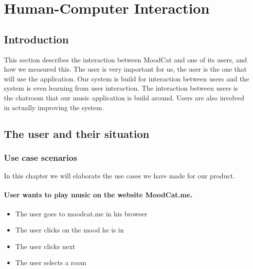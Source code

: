 \chapter{Human-Computer Interaction}

\section{Introduction}
This section describes the interaction between MoodCat and one of its users, and how we measured this.
The user is very important for us, the user is the one that will use the application.
Our system is build for interaction between users and the system is even learning from user interaction.
The interaction between users is the chatroom that our music application is build around.
Users are also involved in actually improving the system.



\section{The user and their situation}

\subsection{Use case scenarios}
In this chapter we will elaborate the use cases we have made for our product.

\subsubsection{User wants to play music on the website MoodCat.me.}
\begin{itemize}
\item The user goes to moodcat.me in his browser
\item The user clicks on the mood he is in
\item The user clicks next
\item The user selects a room
\end{itemize}

